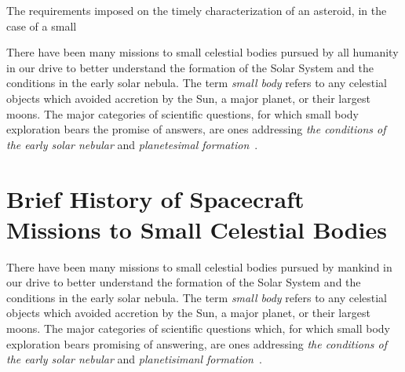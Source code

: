 The requirements imposed on the timely characterization of an asteroid, in the
case of a small


\cite{Marks2022}


There have been many missions to small celestial bodies pursued by all humanity
in our drive to better understand the formation of the Solar System and the
conditions in the early solar nebula. The term \textit{small body} refers to any
celestial objects which avoided accretion by the Sun, a major planet, or their
largest moons. The major categories of scientific questions, for which
small body exploration bears the promise of answers, are ones addressing
\textit{the conditions of the early solar nebular} and \textit{planetesimal
formation}~\cite{Davidsson2021}.



%

\section{Brief History of Spacecraft Missions to Small Celestial Bodies}

There have been many missions to small celestial bodies pursued by mankind in
our drive to better understand the formation of the Solar System and the
conditions in the early solar nebula. The term \textit{small body} refers to any
celestial objects which avoided accretion by the Sun, a major planet, or their
largest moons. The major categories of scientific questions which, for which
small body exploration bears promising of answering, are ones addressing
\textit{the conditions of the early solar nebular} and \textit{planetisimanl
formation}~\cite{Davidsson2021}.